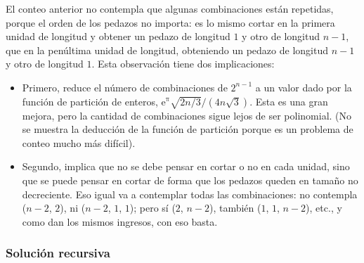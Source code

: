 El conteo anterior no contempla que algunas combinaciones están repetidas, porque el orden de los pedazos no importa: es lo mismo cortar en la primera unidad de longitud y obtener un pedazo de longitud $1$ y otro de longitud $n-1$, que en la penúltima unidad de longitud, obteniendo un pedazo de longitud $n-1$ y otro de longitud $1$. Esta observación tiene dos implicaciones:
\begin{itemize}
  \item Primero, reduce el número de combinaciones de $2^{n-1}$ a un valor dado por la función de partición de enteros, $\mathrm{e}^\mathrm{\pi}\sqrt{2n/3}/(4n\sqrt{3})$. Esta es una gran mejora, pero la cantidad de combinaciones sigue lejos de ser polinomial. (No se muestra la deducción de la función de partición porque es un problema de conteo mucho más difícil).
  \item Segundo, implica que no se debe pensar en cortar o no en cada unidad, sino que se puede pensar en cortar de forma que los pedazos queden en tamaño no decreciente. Eso igual va a contemplar todas las combinaciones: no contempla ($n-2$, $2$), ni ($n-2$, $1$, $1$); pero sí ($2$, $n-2$), también ($1$, $1$, $n-2$), etc., y como dan los mismos ingresos, con eso basta.
\end{itemize}

\subsubsection{Solución recursiva}

